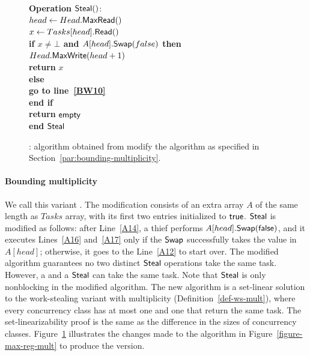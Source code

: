 \begin{figure}[H]
{\begin{minipage}[t]{150mm}
\begin{tabbing}
        {\bf Operation} \({\sf Steal}()\): \\
         \> \> \(head \leftarrow Head.{\sf MaxRead}()\)\\
         \> \> \(x \leftarrow Tasks[head].{\sf Read}()\) \\
         \> \> {\bf if \(x \neq \bot\) and \(A[head].{\sf Swap}(false)\) then}\\
         \> \> \> \(Head.{\sf MaxWrite}(head+1)\)\\

         \> \> \> {\bf return} \(x\)\\
         \> \> {\bf else } \\
         \> \> \> {\bf go to line~\ref{BW10}} \\
         \> \> {\bf end if}\\
         \> \> {\bf return} ${\sf empty}$\\
        {\bf end} ${\sf Steal}$

      \end{tabbing}
    \end{minipage}
  }
  \caption{\label{figure-b-w-mult}\BNCWSM: algorithm obtained from modify the algorithm \WFWSM as specified in Section~\ref{par:bounding-multiplicity}.}
\end{figure}

\paragraph*{\label{par:bounding-multiplicity}Bounding multiplicity}

We call this variant \BNCWSM. The modification consists of an extra array \(A\) of the same length as \(Tasks\) array, with its first two entries initialized to ${\sf true}$.  ${\sf Steal}$ is modified as follows: after Line~\ref{A14}, a thief performs \(A[head].{\sf Swap}({\sf false})\), and it executes Lines~\ref{A16} and~\ref{A17} only if the ${\sf Swap}$ successfully takes the \true value in \(A[head]\); otherwise, it goes to the Line~\ref{A12} to start over.  The modified algorithm guarantees no two distinct ${\sf Steal}$ operations take the same task. However, a \Take and a ${\sf Steal}$ can take the same task.  Note that ${\sf Steal}$ is only nonblocking in the modified algorithm.  The new algorithm is a set-linear solution to the work-stealing variant with multiplicity (Definition~\ref{def-ws-mult}), where every concurrency class has at most one \Take and one \Steal that return the same task. The set-linearizability proof is the same as the difference in the sizes of concurrency classes. Figure~\ref{figure-b-w-mult} illustrates the changes made to the algorithm in Figure~\ref{figure-max-reg-mult} to produce the \BNCWSM version.



